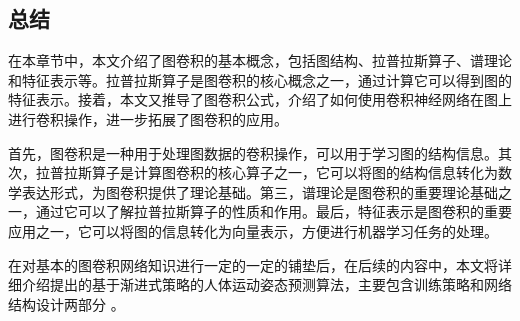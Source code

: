 \subsection{总结}
在本章节中，本文介绍了图卷积的基本概念，包括图结构、拉普拉斯算子、谱理论和特征表示等。拉普拉斯算子是图卷积的核心概念之一，通过计算它可以得到图的特征表示。接着，本文又推导了图卷积公式，介绍了如何使用卷积神经网络在图上进行卷积操作，进一步拓展了图卷积的应用。

首先，图卷积是一种用于处理图数据的卷积操作，可以用于学习图的结构信息。其次，拉普拉斯算子是计算图卷积的核心算子之一，它可以将图的结构信息转化为数学表达形式，为图卷积提供了理论基础。第三，谱理论是图卷积的重要理论基础之一，通过它可以了解拉普拉斯算子的性质和作用。最后，特征表示是图卷积的重要应用之一，它可以将图的信息转化为向量表示，方便进行机器学习任务的处理。

在对基本的图卷积网络知识进行一定的一定的铺垫后，在后续的内容中，本文将详细介绍提出的基于渐进式策略的人体运动姿态预测算法，主要包含训练策略和网络结构设计两部分
。
